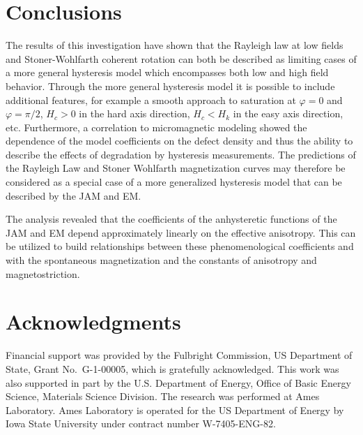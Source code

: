 \documentclass[../main.tex]{subfiles}
\begin{document}
\section{Conclusions}
The results of this investigation have shown that the Rayleigh law at low fields and Stoner-Wohlfarth coherent rotation can both be described as limiting cases of a more general hysteresis model which encompasses both low and high field behavior. Through the more general hysteresis model it is possible to include additional features, for example a smooth  approach to saturation at $\varphi=0$ and $\varphi=\pi/2$, $H_c>0$ in the hard axis direction, $H_c<H_k$ in the easy axis direction, etc. Furthermore, a correlation to micromagnetic modeling showed the dependence of the model coefficients on the defect density and thus the ability to describe the effects of degradation by hysteresis measurements. The predictions of the Rayleigh Law and Stoner Wohlfarth magnetization curves may therefore be considered as a special case of a more generalized hysteresis model that can be described by the JAM and EM.

The analysis revealed that the coefficients of the anhysteretic functions of the JAM and EM depend approximately linearly on the effective anisotropy. This can be utilized to build relationships between these phenomenological coefficients and with the spontaneous magnetization and the constants of anisotropy and magnetostriction.

\section{Acknowledgments}
Financial support was provided by the Fulbright Commission, US Department of State, Grant No.~G-1-00005, which is gratefully acknowledged. This work was also supported in part by the U.S. Department of Energy, Office of Basic Energy Science, Materials Science Division. The research was performed at Ames Laboratory. Ames Laboratory is operated for the US Department of Energy by Iowa State University under contract number W-7405-ENG-82.

\cleardoublepage
\end{document}
